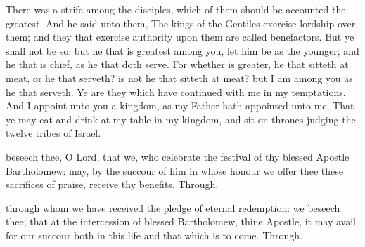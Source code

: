 
 There was a strife among the disciples, which of them should be accounted the greatest. And he said unto them, The kings of the Gentiles exercise lordship over them; and they that exercise authority upon them are called benefactors. But ye shall not be so: but he that is greatest among you, let him be as the younger; and he that is chief, as he that doth serve. For whether is greater, he that sitteth at meat, or he that serveth? is not he that sitteth at meat? but I am among you as he that serveth. Ye are they which have continued with me in my temptations. And I appoint unto you a kingdom, as my Father hath appointed unto me; That ye may eat and drink at my table in my kingdom, and sit on thrones judging the twelve tribes of Israel.


\vspace{-0.4\baselineskip}

\secret

\vspace{-0.2\baselineskip}

 beseech thee, O Lord, that we, who celebrate the festival of thy blessed Apostle Bartholomew: may, by the succour of him in whose honour we offer thee these sacrifices of praise, receive thy benefits. Through.


\vspace{-0.4\baselineskip}

\postcommunion

\vspace{-0.2\baselineskip}

 through whom we have received the pledge of eternal redemption: we beseech thee; that at the intercession of blessed Bartholomew, thine Apostle, it may avail for our succour both in this life and that which is to come. Through.


